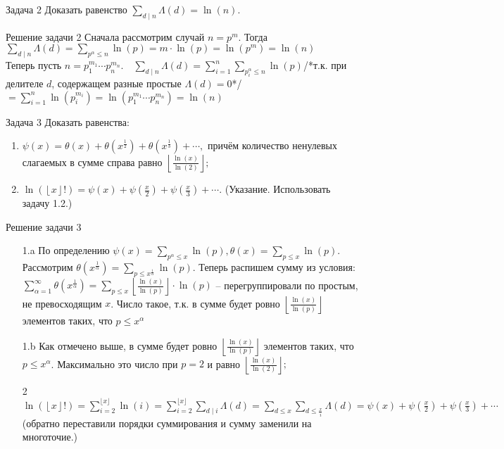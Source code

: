 \documentclass[a4paper,12pt]{article}
\newcommand{\TE}{\theta}
\newcommand{\AL}{\alpha}
\newcommand{\SI}{\psi}
\newcommand{\q}{\quad}
\newcommand{\SL}{\sum\limits}
\begin{document}
\begin{mybox}{}
\begin{task}{Задача 2}
Доказать равенство $\SL_{d\mid n}\Lambda(d) = \ln(n).$
\end{task}
\begin{sol}{Решение задачи 2}
Сначала рассмотрим случай $n = p^m$. Тогда $\SL_{d\mid n}\Lambda(d) = \SL_{p^\AL \le n}\ln(p) = m\cdot \ln(p) = \ln(p^m) = \ln(n) $\\
Теперь пусть $n = p_1^{m_1}\cdots p_n^{m_n}. \q \SL_{d\mid n}\Lambda(d) = \SL_{i = 1}^n \SL_{p_i^\AL\le n} \ln(p) ${/*т.к. при делителе $d$, содержащем разные простые $\Lambda(d) = 0$*/}$ = \SL_{i = 1}^n \ln(p_i^{m_i}) = \ln(p_1^{m_1}\cdots p_n^{m_n}) = \ln(n)$ 
\end{sol}

\end{mybox}

\begin{mybox}{}
\begin{task}{Задача 3}
Доказать равенства:
\begin{enumerate}
\item $\SI(x) = \TE(x) + \TE(x^\frac{1}{2}) + \TE(x^\frac{1}{3}) + \cdots,$ причём количество ненулевых слагаемых в сумме справа равно $\left\lfloor\frac{\ln(x)}{\ln(2)}\right\rfloor;$
\item $\ln(\left\lfloor x\right\rfloor!) = \SI(x) + \SI(\frac{x}{2}) + \SI(\frac{x}{3}) + \cdots.$ (Указание. Использовать задачу 1.2.)
\end{enumerate}
\end{task}
\begin{sol}{Решение задачи 3}
\begin{enumerate}
\item[1.a] По определению $\SI(x) = \SL_{p^\AL\le x}\ln(p), \TE(x) = \SL_{p\le x}\ln(p).$\\
Рассмотрим $\TE(x^\frac{1}{\AL}) = \SL_{p \le x^\frac{1}{\AL}} \ln(p)$. Теперь распишем сумму из условия: $\SL_{\AL = 1}^\infty  \TE(x^\frac{1}{\AL}) = \SL_{p \le x}  \left\lfloor \frac{\ln(x)}{\ln(p)}  \right\rfloor \cdot \ln(p)$ -- перегруппировали по простым, не превосходящим $x$. Число такое, т.к. в сумме будет ровно $\left\lfloor \frac{\ln(x)}{\ln(p)}  \right\rfloor$ элементов таких, что $p \le x^{\AL}$\\
\item[1.b] Как отмечено выше, в сумме будет ровно $\left\lfloor \frac{\ln(x)}{\ln(p)}  \right\rfloor$ элементов таких, что $p \le x^{\AL}$. Максимально это число при $p=2$ и равно  $\left\lfloor\frac{\ln(x)}{\ln(2)}\right\rfloor;$
\item[2\;] $\ln(\left\lfloor x\right\rfloor!) = \SL_{i = 2}^{\lfloor x\rfloor} \ln(i)  = \SL_{i = 2}^{\lfloor x\rfloor} \SL_{d\mid i} \Lambda(d)  = \SL_{d \le x}\SL_{d \le \frac{x}{i}} \Lambda(d) = \SI(x) + \SI(\frac{x}{2}) + \SI(\frac{x}{3}) + \cdots$ \\(обратно переставили порядки суммирования и сумму заменили на многоточие.)
\end{enumerate}
\end{sol}


\end{mybox}
\end{document}

